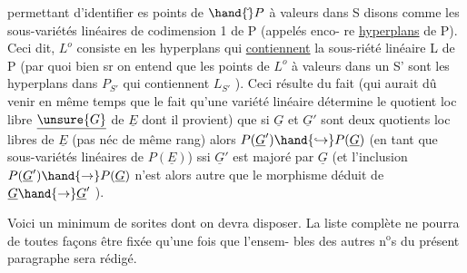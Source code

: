  

permettant d'identifier es points de $\hand{\check{}}P$\hand{,} à valeurs dans  S disons\hand{,}
comme les sous-variétés linéaires de codimension 1 de P (appelés enco-%
re \uline{hyperplans} de P). Ceci dit, $L^{o}$ consiste en les hyperplans qui
\uline{contiennent} la sous-riété linéaire L de P (par quoi bien sr on
entend que les points de $L^{o}$  à valeurs dans un S' sont les
hyperplans dans $P_{S'}$ qui contiennent $L_{S'}$ ). Ceci résulte du fait 
(qui aurait dû venir en même temps que le fait qu'une variété linéaire \hand{,}
détermine le quotient loc libre $\underline{\unsure{G}}$ de $\underline{E}$ dont il provient) que si
$\underline{G}$ et $\underline{G}'$ sont deux quotients loc libres de $\underline{E}$ (pas néc de même rang)
alors $P(\underline{G}')\hand{\hookrightarrow}P(\underline{G})$ (en tant que sous-variétés linéaires de $P(\underline{E})$) ssi
$\underline{G}'$ est majoré par $\underline{G}$ (et l'inclusion $P(\underline{G}')\hand{\rightarrow}P(\underline{G})$ n'est alors autre
que le morphisme déduit de $\underline{G}\hand{\rightarrow}\underline{G}'$ ).

Voici un minimum de sorites dont on devra disposer. La liste
complète ne pourra de toutes façons être fixée qu'une fois que l'ensem-%
bles des autres n$^{\text{o}}$s du présent paragraphe sera rédigé.

